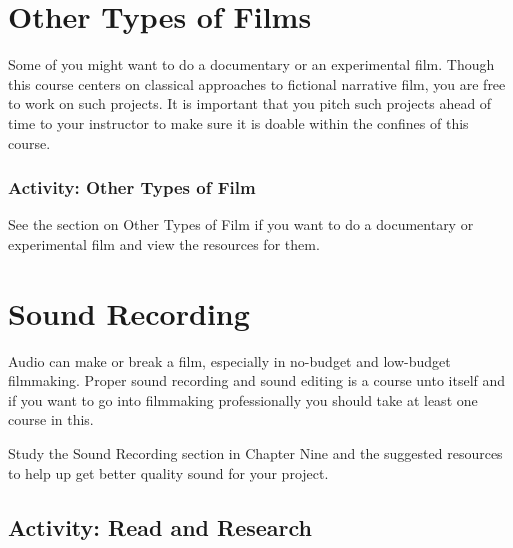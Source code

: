 \documentclass[
  letterpaper,
  DIV=11,
  numbers=noendperiod]{scrreprt}
\begin{document}
\section{Other Types of Films}\label{other-types-of-films}

Some of you might want to do a documentary or an experimental film.
Though this course centers on classical approaches to fictional
narrative film, you are free to work on such projects. It is important
that you pitch such projects ahead of time to your instructor to make
sure it is doable within the confines of this course.

\subsubsection{Activity: Other Types of
Film}\label{activity-other-types-of-film}

\begin{tcolorbox}[enhanced jigsaw, titlerule=0mm, opacitybacktitle=0.6, left=2mm, title={Learning Activity}, coltitle=black, colbacktitle=quarto-callout-note-color!10!white, toptitle=1mm, bottomtitle=1mm, colframe=quarto-callout-note-color-frame, colback=white, arc=.35mm, rightrule=.15mm, bottomrule=.15mm, toprule=.15mm, opacityback=0, breakable, leftrule=.75mm]

See the section on Other Types of Film if you want to do a documentary
or experimental film and view the resources for them.

\end{tcolorbox}

\section{Sound Recording}\label{sound-recording}

Audio can make or break a film, especially in no-budget and low-budget
filmmaking. Proper sound recording and sound editing is a course unto
itself and if you want to go into filmmaking professionally you should
take at least one course in this.

Study the Sound Recording section in Chapter Nine and the suggested
resources to help up get better quality sound for your project.

\subsection{Activity: Read and
Research}\label{activity-read-and-research}
\end{document}
